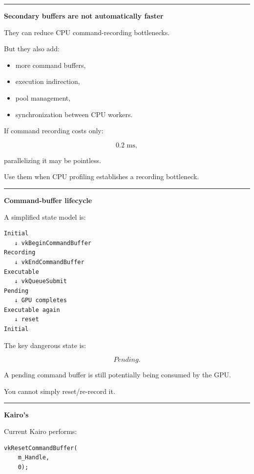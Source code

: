 \begin{center}\rule{0.5\linewidth}{0.5pt}\end{center}

\textbf{Secondary buffers are not automatically faster}

They can reduce CPU command-recording bottlenecks.

But they also add:

\begin{itemize}
\tightlist
\item
  more command buffers,
\item
  execution indirection,
\item
  pool management,
\item
  synchronization between CPU workers.
\end{itemize}

If command recording costs only:

\[
0.2\text{ ms},
\]

parallelizing it may be pointless.

Use them when CPU profiling establishes a recording bottleneck.

\begin{center}\rule{0.5\linewidth}{0.5pt}\end{center}

\textbf{Command-buffer lifecycle}

A simplified state model is:

\begin{verbatim}
Initial
   ↓ vkBeginCommandBuffer
Recording
   ↓ vkEndCommandBuffer
Executable
   ↓ vkQueueSubmit
Pending
   ↓ GPU completes
Executable again
   ↓ reset
Initial
\end{verbatim}

The key dangerous state is:

\[
\boxed{Pending}.
\]

A pending command buffer is still potentially being consumed by the GPU.

You cannot simply reset/re-record it.

\begin{center}\rule{0.5\linewidth}{0.5pt}\end{center}

\textbf{Kairo's }

Current Kairo performs:

\begin{verbatim}
vkResetCommandBuffer(
    m_Handle,
    0);
\end{verbatim}

